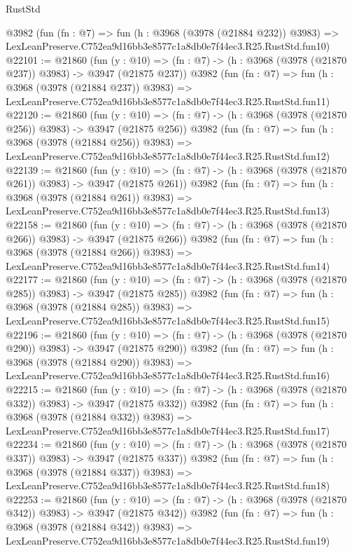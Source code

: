\begin{lexlean}{RustStd}
\begin{coremodule}
    @3982
    (fun (fn : @7) =>
    fun (h : @3968 (@3978 (@21884 @232)) @3983) =>
    LexLeanPreserve.C752ea9d16bb3e8577c1a8db0e7f44ec3.R25.RustStd.fun10)
@22101 := @21860
    (fun (y : @10) => (fn : @7) -> (h : @3968 (@3978 (@21870 @237)) @3983) -> @3947 (@21875 @237))
    @3982
    (fun (fn : @7) =>
    fun (h : @3968 (@3978 (@21884 @237)) @3983) =>
    LexLeanPreserve.C752ea9d16bb3e8577c1a8db0e7f44ec3.R25.RustStd.fun11)
@22120 := @21860
    (fun (y : @10) => (fn : @7) -> (h : @3968 (@3978 (@21870 @256)) @3983) -> @3947 (@21875 @256))
    @3982
    (fun (fn : @7) =>
    fun (h : @3968 (@3978 (@21884 @256)) @3983) =>
    LexLeanPreserve.C752ea9d16bb3e8577c1a8db0e7f44ec3.R25.RustStd.fun12)
@22139 := @21860
    (fun (y : @10) => (fn : @7) -> (h : @3968 (@3978 (@21870 @261)) @3983) -> @3947 (@21875 @261))
    @3982
    (fun (fn : @7) =>
    fun (h : @3968 (@3978 (@21884 @261)) @3983) =>
    LexLeanPreserve.C752ea9d16bb3e8577c1a8db0e7f44ec3.R25.RustStd.fun13)
@22158 := @21860
    (fun (y : @10) => (fn : @7) -> (h : @3968 (@3978 (@21870 @266)) @3983) -> @3947 (@21875 @266))
    @3982
    (fun (fn : @7) =>
    fun (h : @3968 (@3978 (@21884 @266)) @3983) =>
    LexLeanPreserve.C752ea9d16bb3e8577c1a8db0e7f44ec3.R25.RustStd.fun14)
@22177 := @21860
    (fun (y : @10) => (fn : @7) -> (h : @3968 (@3978 (@21870 @285)) @3983) -> @3947 (@21875 @285))
    @3982
    (fun (fn : @7) =>
    fun (h : @3968 (@3978 (@21884 @285)) @3983) =>
    LexLeanPreserve.C752ea9d16bb3e8577c1a8db0e7f44ec3.R25.RustStd.fun15)
@22196 := @21860
    (fun (y : @10) => (fn : @7) -> (h : @3968 (@3978 (@21870 @290)) @3983) -> @3947 (@21875 @290))
    @3982
    (fun (fn : @7) =>
    fun (h : @3968 (@3978 (@21884 @290)) @3983) =>
    LexLeanPreserve.C752ea9d16bb3e8577c1a8db0e7f44ec3.R25.RustStd.fun16)
@22215 := @21860
    (fun (y : @10) => (fn : @7) -> (h : @3968 (@3978 (@21870 @332)) @3983) -> @3947 (@21875 @332))
    @3982
    (fun (fn : @7) =>
    fun (h : @3968 (@3978 (@21884 @332)) @3983) =>
    LexLeanPreserve.C752ea9d16bb3e8577c1a8db0e7f44ec3.R25.RustStd.fun17)
@22234 := @21860
    (fun (y : @10) => (fn : @7) -> (h : @3968 (@3978 (@21870 @337)) @3983) -> @3947 (@21875 @337))
    @3982
    (fun (fn : @7) =>
    fun (h : @3968 (@3978 (@21884 @337)) @3983) =>
    LexLeanPreserve.C752ea9d16bb3e8577c1a8db0e7f44ec3.R25.RustStd.fun18)
@22253 := @21860
    (fun (y : @10) => (fn : @7) -> (h : @3968 (@3978 (@21870 @342)) @3983) -> @3947 (@21875 @342))
    @3982
    (fun (fn : @7) =>
    fun (h : @3968 (@3978 (@21884 @342)) @3983) =>
    LexLeanPreserve.C752ea9d16bb3e8577c1a8db0e7f44ec3.R25.RustStd.fun19)

\end{coremodule}
\end{lexlean}
